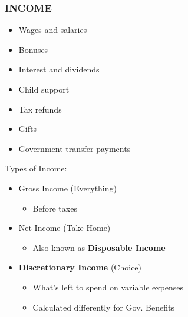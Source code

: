 \documentclass[12pt]{article}
\begin{document}
            \subsubsection{INCOME}
                \begin{itemize}
                    \item Wages and salaries
                    \item Bonuses
                    \item Interest and dividends
                    \item Child support
                    \item Tax refunds
                    \item Gifts
                    \item Government transfer payments
                \end{itemize}
                Types of Income:
                    \begin{itemize}
                        \item Gross Income (Everything)
                            \begin{itemize}
                                \item Before taxes
                            \end{itemize}
                        \item Net Income (Take Home)
                            \begin{itemize}
                                \item Also known as \textbf{Disposable Income}
                            \end{itemize}
                        \item \textbf{Discretionary Income} (Choice)
                            \begin{itemize}
                                \item What's left to spend on variable expenses
                                \item Calculated differently for Gov. Benefits
                            \end{itemize}
                    \end{itemize}
\end{document}
